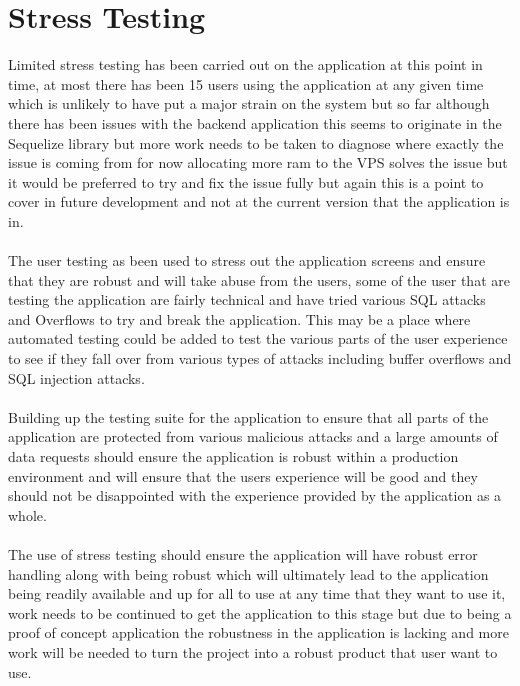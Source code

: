 \section{Stress Testing}

Limited stress testing has been carried out on the application at this point in time, at most there has been 15 users using the application at any given time which is unlikely to have put a major strain on the system but so far although there has been issues with the backend application this seems to originate in the Sequelize library but more work needs to be taken to diagnose where exactly the issue is coming from for now allocating more ram to the VPS solves the issue but it would be preferred to try and fix the issue fully but again this is a point to cover in future development and not at the current version that the application is in.\\
\\
The user testing as been used to stress out the application screens and ensure that they are robust and will take abuse from the users, some of the user that are testing the application are fairly technical and have tried various SQL attacks and Overflows to try and break the application. This may be a place where automated testing could be added to test the various parts of the user experience to see if they fall over from various types of attacks including buffer overflows and SQL injection attacks.\\
\\
Building up the testing suite for the application to ensure that all parts of the application are protected from various malicious attacks and a large amounts of data requests should ensure the application is robust within a production environment and will ensure that the users experience will be good and they should not be disappointed with the experience provided by the application as a whole.\\
\\
The use of stress testing should ensure the application will have robust error handling along with being robust which will ultimately lead to the application being readily available and up for all to use at any time that they want to use it, work needs to be continued to get the application to this stage but due to being a proof of concept application the robustness in the application is lacking and more work will be needed to turn the project into a robust product that user want to use.
